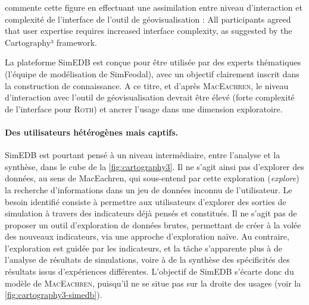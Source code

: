 \textcite[16]{roth_interactivity_2015} commente cette figure en effectuant une assimilation entre niveau d'interaction et complexité de l'interface de l'outil de géovisualisation : \og All participants agreed that user expertise requires increased interface complexity, as suggested by the Cartography³ framework\fg{}.

La plateforme SimEDB est conçue pour être utilisée par des experts thématiques (l'équipe de modélisation de SimFeodal), avec un objectif clairement inscrit dans la construction de connaissance.
A ce titre, et d'après \textsc{MacEachren}, le niveau d'interaction avec l'outil de géovisualisation devrait être élevé (forte complexité de l'interface pour \textsc{Roth}) et ancrer l'usage dans une dimension exploratoire.



\paragraph{Des utilisateurs hétérogènes mais captifs.}

SimEDB est pourtant pensé à un niveau intermédiaire, entre l'analyse et la synthèse, dans le cube de la \cref{fig:cartography3}.
Il ne s'agit ainsi pas d'explorer des données, au sens de MacEachren, qui sous-entend par cette exploration (\textit{explore}) la recherche d'informations dans un jeu de données inconnu de l'utilisateur.
Le besoin identifié consiste à permettre aux utilisateurs d'explorer des sorties de simulation à travers des indicateurs déjà pensés et constitués.
Il ne s'agit pas de proposer un outil d'exploration de données brutes, permettant de créer à la volée des nouveaux indicateurs, via une approche d'exploration \og naïve\fg{}.
Au contraire, l'exploration est guidée par les indicateurs, et la tâche s'apparente plus à de l'analyse de résultats de simulations, voire à de la synthèse des spécificités des résultats issus d'expériences différentes.
L'objectif de SimEDB s'écarte donc du \og modèle\fg{} de \textsc{MacEachren}, puisqu'il ne se situe pas sur la \og droite\fg{} des usages (voir la \cref{fig:cartography3-simedb}).

